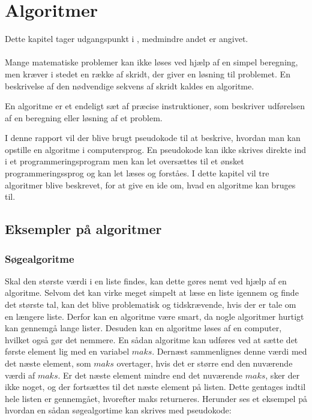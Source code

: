 \chapter{Algoritmer}
Dette kapitel tager udgangspunkt i \citep{dmat}, medmindre andet er angivet.\\ 
\\
Mange matematiske problemer kan ikke løses ved hjælp af en simpel beregning, men kræver i stedet en række af skridt, der giver en løsning til problemet. 
En beskrivelse af den nødvendige sekvens af skridt kaldes en algoritme. 


\begin{defn}
En algoritme er et endeligt sæt af præcise instruktioner, som beskriver udførelsen af en beregning eller løsning af et problem.
\end{defn}

I denne rapport vil der blive brugt pseudokode til at beskrive, hvordan man kan opstille en algoritme i computersprog. 
En pseudokode kan ikke skrives direkte ind i et programmeringsprogram men kan let oversættes til et ønsket programmeringssprog og kan let læses og forståes. 
I dette kapitel vil tre algoritmer blive beskrevet, for at give en ide om, hvad en algoritme kan bruges til. 

\section{Eksempler på algoritmer}
\subsection{Søgealgoritme}
Skal den største værdi i en liste findes, kan dette gøres nemt ved hjælp af en algoritme. 
Selvom det kan virke meget simpelt at læse en liste igennem og finde det største tal, kan det blive problematisk og tidskrævende, hvis der er tale om en længere liste. 
Derfor kan en algoritme være smart, da nogle algoritmer hurtigt kan gennemgå lange lister. 
Desuden kan en algoritme løses af en computer, hvilket også gør det nemmere. 
En sådan algoritme kan udføres ved at sætte det første element lig med en variabel $maks$. 
Dernæst sammenlignes denne værdi med det næste element, som  $maks$ overtager, hvis det er større end den nuværende værdi af $maks$. 
Er det næste element mindre end det nuværende $maks$, sker der ikke noget, og der fortsættes til det næste element på listen. 
Dette gentages indtil hele listen er gennemgået, hvorefter maks returneres.
Herunder ses et eksempel på hvordan en sådan søgealgortime kan skrives med pseudokode:


